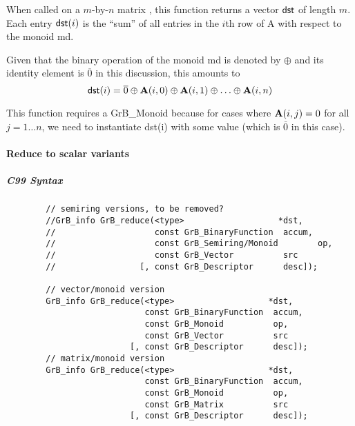 When called on a $m$-by-$n$ matrix , this function returns a vector ${\sf dst}$ of length $m$. Each entry
${\sf dst}(i)$ is the ``sum'' of all entries in the $i$th row of {\sf A} with respect to the monoid {\sf md}. 

Given that the binary operation of the monoid {\sf md} is denoted by $\oplus$ and its identity element is $\overline{0}$ in this discussion, 
this amounts to $$ {\sf dst}(i) = \overline{0} \oplus {\bf A}(i,0) \oplus {\bf A}(i,1) \oplus  \ldots \oplus  {\bf A}(i,n) $$

This function requires a GrB\_Monoid because for cases where ${\bf A}(i,j) = 0$ for all $j=1 \ldots n$, we need to instantiate {\sf dst}(i) with some value (which
is $\overline{0}$ in this case).







\paragraph{Reduce to scalar variants}





\subparagraph{C99 Syntax}

\begin{verbatim}
        // semiring versions, to be removed?
        //GrB_info GrB_reduce(<type>                   *dst,
        //                    const GrB_BinaryFunction  accum,
        //                    const GrB_Semiring/Monoid        op,
        //                    const GrB_Vector          src
        //                 [, const GrB_Descriptor      desc]);
                         
        // vector/monoid version
        GrB_info GrB_reduce(<type>                   *dst,
                            const GrB_BinaryFunction  accum,
                            const GrB_Monoid          op,
                            const GrB_Vector          src
                         [, const GrB_Descriptor      desc]);
        // matrix/monoid version
        GrB_info GrB_reduce(<type>                   *dst,
                            const GrB_BinaryFunction  accum,
                            const GrB_Monoid          op,
                            const GrB_Matrix          src
                         [, const GrB_Descriptor      desc]);
\end{verbatim}


